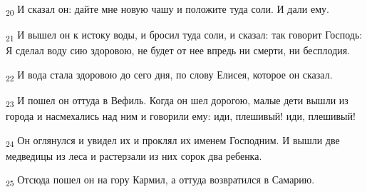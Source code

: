 \begin{tcolorbox}
\textsubscript{20} И сказал он: дайте мне новую чашу и положите туда соли. И дали ему.
\end{tcolorbox}
\begin{tcolorbox}
\textsubscript{21} И вышел он к истоку воды, и бросил туда соли, и сказал: так говорит Господь: Я сделал воду сию здоровою, не будет от нее впредь ни смерти, ни бесплодия.
\end{tcolorbox}
\begin{tcolorbox}
\textsubscript{22} И вода стала здоровою до сего дня, по слову Елисея, которое он сказал.
\end{tcolorbox}
\begin{tcolorbox}
\textsubscript{23} И пошел он оттуда в Вефиль. Когда он шел дорогою, малые дети вышли из города и насмехались над ним и говорили ему: иди, плешивый! иди, плешивый!
\end{tcolorbox}
\begin{tcolorbox}
\textsubscript{24} Он оглянулся и увидел их и проклял их именем Господним. И вышли две медведицы из леса и растерзали из них сорок два ребенка.
\end{tcolorbox}
\begin{tcolorbox}
\textsubscript{25} Отсюда пошел он на гору Кармил, а оттуда возвратился в Самарию.
\end{tcolorbox}
